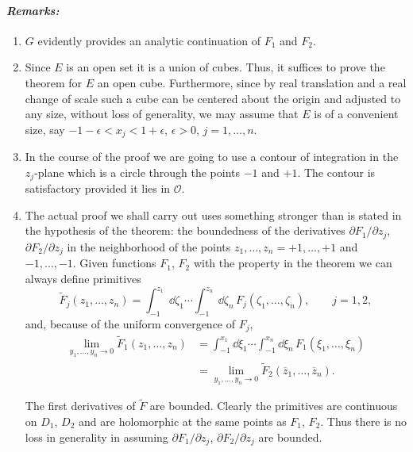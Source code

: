\paragraph{\emph{Remarks:}}
\begin{enumerate}
  \renewcommand{\labelenumi}{\arabic{enumi}.}
  \item $G$ evidently provides an analytic continuation of $F_1$ and $F_2$.

  \item Since $E$ is an open set it is a union of cubes. Thus, it suffices to
  prove the theorem for $E$ an open cube. Furthermore, since by real
  translation and a real change of scale such a cube can be centered about the
  origin and adjusted to any size, without loss of generality, we may assume
  that $E$ is of a convenient size, say $-1-\epsilon<x_j<1+\epsilon$,
  $\epsilon>0$, $j=1,\ldots,n$.

  \item In the course of the proof we are going to use a contour of integration
  in the $z_j$-plane which is a circle through the points $-1$ and $+1$. The
  contour is satisfactory provided it lies in $\mathcal{O}$.

  \item The actual proof we shall carry out uses something stronger than is
  stated in the hypothesis of the theorem: the boundedness of the derivatives
  $\partial F_1/\partial z_j$, $\partial F_2/\partial z_j$ in the neighborhood
  of the points $z_1,\ldots,z_n=+1,\ldots,+1$ and $-1,\ldots,-1$. Given
  functions $F_1$, $F_2$ with the property in the theorem we can always define
  primitives
  \[
    \widetilde F_j(z_1,\ldots,z_n)
    =\int_{-1}^{z_1}\dd\zeta_1\cdots
      \int_{-1}^{z_n}\dd\zeta_n\,F_j(\zeta_1,\ldots,\zeta_n),
    \qquad j=1,2,
  \]
  and, because of the uniform convergence of $F_j$,
  \[
    \begin{aligned}
      \lim_{y_1,\ldots,y_n\to0}
      \widetilde F_1(z_1,\ldots,z_n)
      & =\int_{-1}^{x_1}\dd\xi_1\cdots
        \int_{-1}^{x_n}\dd\xi_n\,F_1(\xi_1,\ldots,\xi_n) \\
      & =\lim_{y_1,\ldots,y_n\to0}
        \widetilde F_2(\overline z_1,\ldots,\overline z_n).
    \end{aligned}
  \]

  The first derivatives of $\widetilde F$ are bounded. Clearly the primitives
  are continuous on $D_1$, $D_2$ and are holomorphic at the same points as
  $F_1$, $F_2$. Thus there is no loss in generality in assuming
  $\partial F_1/\partial z_j$, $\partial F_2/\partial z_j$ are bounded.
\end{enumerate}

